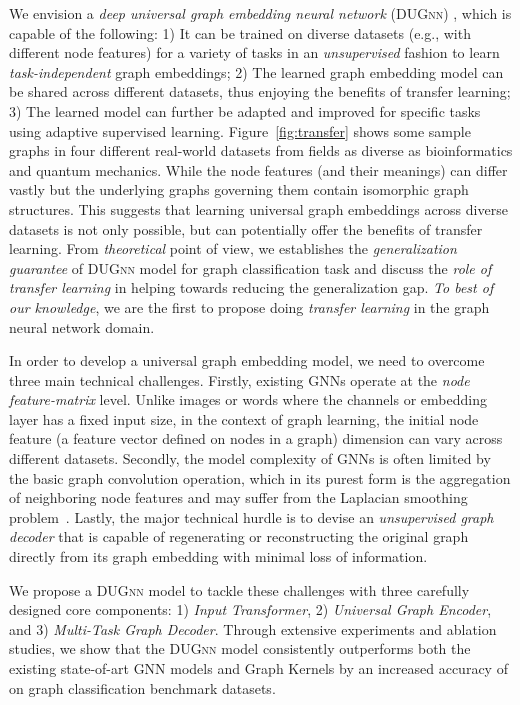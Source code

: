 \documentclass{article}
\begin{document}
We envision a {\em deep universal graph  embedding neural network} (\textsc{DUGnn})	, which is  capable of the following: 1) It can be trained on diverse datasets (e.g., with different node features) for a variety of tasks in an {\em unsupervised} fashion to learn  {\em task-independent} graph embeddings; 2) The learned graph embedding model can be shared across different datasets, thus enjoying the benefits of   transfer learning; 3) The learned model can  further be adapted and improved for specific tasks using adaptive supervised learning.  Figure~\ref{fig:transfer} shows some sample graphs in four different real-world datasets from fields as diverse as bioinformatics and quantum mechanics. While the node features (and their meanings) can differ vastly but the underlying graphs governing them contain isomorphic graph structures. This   suggests that learning universal graph embeddings across diverse datasets is not only possible, but can potentially offer the benefits of transfer learning. From \emph{theoretical} point of view, we establishes the \emph{generalization guarantee} of  \textsc{DUGnn} model for graph classification task and discuss the \emph{role of transfer learning} in helping towards reducing the generalization gap. \emph{To best of our knowledge}, we are the first to propose doing \emph{transfer learning}    in the graph neural network domain.

In order to develop a universal graph embedding model, we need to overcome three main technical challenges.  Firstly, existing GNNs  operate at the {\em node feature-matrix} level.
Unlike images or words where the channels or embedding layer has a fixed input size,  in the context of graph learning, the initial node feature (a feature vector defined on nodes in a graph)   dimension can vary across different datasets. Secondly, the model complexity of GNNs is often  limited by the basic graph convolution operation, which in its purest form is the aggregation of neighboring node features and may suffer from the Laplacian smoothing problem~\cite{li2018deeper}. Lastly, the major technical hurdle is to devise an {\em unsupervised graph decoder} that is capable of regenerating or reconstructing the original graph directly from its graph embedding with minimal loss of information. 





We propose a \textsc{DUGnn} model   to tackle these challenges  with three carefully designed core components: 1) {\em Input Transformer}, 2) {\em Universal Graph Encoder}, and   3) {\em Multi-Task Graph Decoder}. 
Through extensive experiments and ablation studies, we show that the   \textsc{DUGnn}  model consistently outperforms both the existing state-of-art GNN models and Graph Kernels by an increased accuracy of  on  graph classification benchmark datasets.
\end{document}
